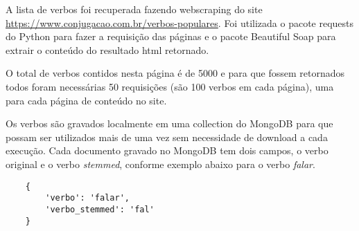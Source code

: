 A lista de verbos foi recuperada fazendo webscraping do site \url{https://www.conjugacao.com.br/verbos-populares}. Foi utilizada o pacote requests do Python 
para fazer a requisição das páginas e o pacote Beautiful Soap para extrair o conteúdo do resultado html retornado.

O total de verbos contidos nesta página é de 5000 e para que fossem retornados todos foram necessárias 50 requisições (são 100 verbos em cada página), 
uma para cada página de conteúdo no site.

Os verbos são gravados localmente em uma collection do MongoDB para que possam ser utilizados mais de uma vez sem necessidade de download a cada execução.
Cada documento gravado no MongoDB tem dois campos, o verbo original e o verbo \textit{stemmed}, conforme exemplo abaixo para o verbo \textit{falar}.

\begin{lstlisting}
    {
        'verbo': 'falar',
        'verbo_stemmed': 'fal'
    }
\end{lstlisting}